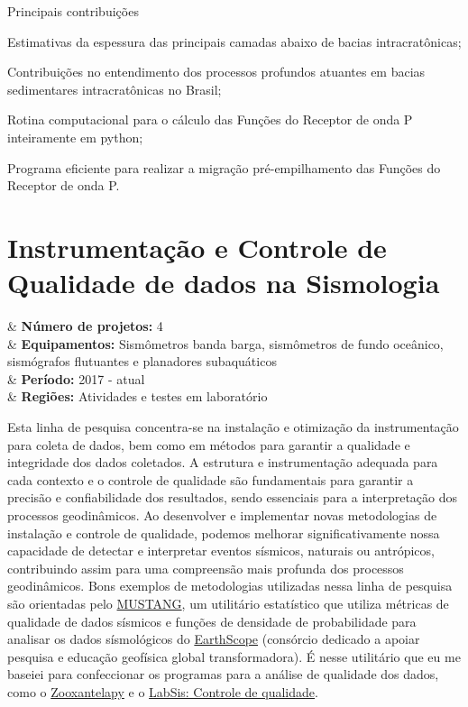 \documentclass[10pt,a4paper,oneside]{book}
\begin{document}
\begin{fancyenum}{\faCogs}{Principais contribuições}
	\item Estimativas da espessura das principais camadas abaixo de bacias intracratônicas;
	\item Contribuições no entendimento dos processos profundos atuantes em bacias sedimentares intracratônicas no Brasil;
	\item Rotina computacional para o cálculo das Funções do Receptor de onda P inteiramente em python;
	\item Programa eficiente para realizar a migração pré-empilhamento das Funções do Receptor de onda P.
\end{fancyenum}

\section{Instrumentação e Controle de Qualidade de dados na Sismologia}
\label{sec_inst_qc}

\begin{summarybox}[frametitle=\faProjectDiagram{}\quad Panorama da linha de pesquisa]
	\begin{datelist}
		\faFile* & \textbf{Número de projetos:} 4 \\
		\faBinoculars & \textbf{Equipamentos:} Sismômetros banda barga, sismômetros de fundo oceânico, sismógrafos flutuantes e planadores subaquáticos \\
		\faCalendar*[regular] & \textbf{Período:} 2017 - atual \\
		\faMapMarked* & \textbf{Regiões:} Atividades e testes em laboratório \\
	\end{datelist}
\end{summarybox}

\bigskip

Esta linha de pesquisa concentra-se na instalação e otimização da instrumentação para coleta de dados, bem como em métodos para garantir a qualidade e integridade dos dados coletados. A estrutura e instrumentação adequada para cada contexto e o controle de qualidade são fundamentais para garantir a precisão e confiabilidade dos resultados, sendo essenciais para a interpretação dos processos geodinâmicos. Ao desenvolver e implementar novas metodologias de instalação e controle de qualidade, podemos melhorar significativamente nossa capacidade de detectar e interpretar eventos sísmicos, naturais ou antrópicos, contribuindo assim para uma compreensão mais profunda dos processos geodinâmicos. Bons exemplos de metodologias utilizadas nessa linha de pesquisa são orientadas pelo \href{https://services.iris.edu/mustang/}{MUSTANG}, um utilitário estatístico que utiliza métricas de qualidade de dados sísmicos e funções de densidade de probabilidade para analisar os dados sísmológicos do \href{https://www.earthscope.org/}{EarthScope} (consórcio dedicado a apoiar pesquisa e educação geofísica global transformadora). É nesse utilitário que eu me baseiei para confeccionar os programas para a análise de qualidade dos dados, como o \href{https://zooxantelapy.readthedocs.io/}{Zooxantelapy} e o \href{https://github.com/dIOGOLOC/codes_escritos/tree/master/LabSis_controle_de_qualidade}{LabSis: Controle de qualidade}.
\end{document}
